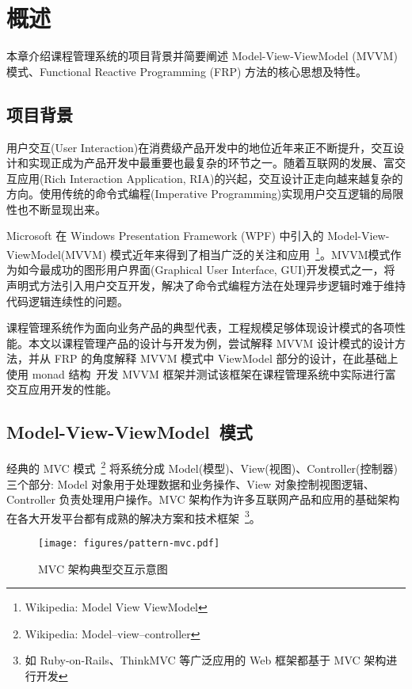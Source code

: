 \chapter{概述}

本章介绍课程管理系统的项目背景并简要阐述 Model-View-ViewModel (MVVM) 模式、Functional Reactive Programming (FRP) 方法的核心思想及特性。

\section{项目背景}

用户交互(User Interaction)在消费级产品开发中的地位近年来正不断提升，交互设计和实现正成为产品开发中最重要也最复杂的环节之一。随着互联网的发展、富交互应用(Rich Interaction Application, RIA)的兴起，交互设计正走向越来越复杂的方向。使用传统的命令式编程(Imperative Programming)实现用户交互逻辑的局限性也不断显现出来。

Microsoft 在 Windows Presentation Framework (WPF) 中引入的 Model-View-ViewModel(MVVM) 模式近年来得到了相当广泛的关注和应用~\footnote{Wikipedia: Model View ViewModel}。MVVM模式作为如今最成功的图形用户界面(Graphical User Interface, GUI)开发模式之一，将声明式方法引入用户交互开发，解决了命令式编程方法在处理异步逻辑时难于维持代码逻辑连续性的问题。

课程管理系统作为面向业务产品的典型代表，工程规模足够体现设计模式的各项性能。本文以课程管理产品的设计与开发为例，尝试解释 MVVM 设计模式的设计方法，并从 FRP 的角度解释 MVVM 模式中 ViewModel 部分的设计，在此基础上使用 monad 结构~\cite{raey}开发 MVVM 框架并测试该框架在课程管理系统中实际进行富交互应用开发的性能。

\section{Model-View-ViewModel~模式}

经典的 MVC 模式~\footnote{Wikipedia: Model–view–controller} 将系统分成 Model(模型)、View(视图)、Controller(控制器) 三个部分: Model 对象用于处理数据和业务操作、View 对象控制视图逻辑、Controller 负责处理用户操作。MVC 架构作为许多互联网产品和应用的基础架构在各大开发平台都有成熟的解决方案和技术框架~\footnote{如 Ruby-on-Rails、ThinkMVC 等广泛应用的 Web 框架都基于 MVC 架构进行开发}。

\begin{figure}[!h]
\begin{center}
\texttt{[image: figures/pattern-mvc.pdf]}
\caption{MVC 架构典型交互示意图\label{MVCOverview}}
\end{center}
\end{figure}


